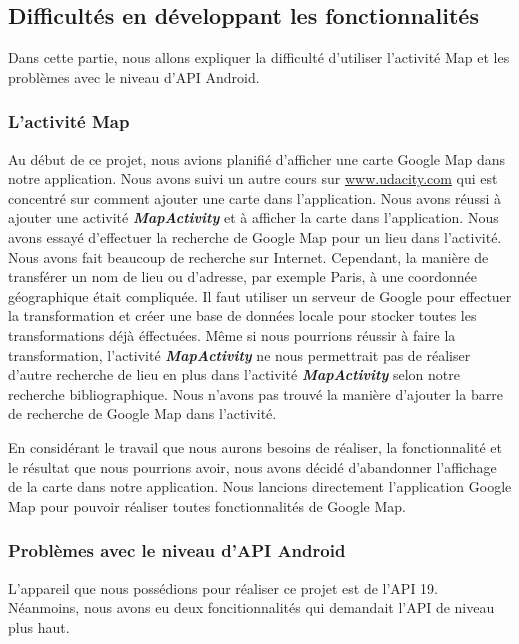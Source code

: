 \subsection{Difficultés en développant les fonctionnalités}

\indent Dans cette partie, nous allons expliquer la difficulté d'utiliser l'activité Map et les problèmes avec le niveau d'API Android.

\subsubsection{L'activité Map}

\indent Au début de ce projet, nous avions planifié d'afficher une carte Google Map dans notre application. Nous avons suivi un autre cours sur \url{www.udacity.com} qui est concentré sur comment ajouter une carte dans l'application. Nous avons réussi à ajouter une activité \textbf{\emph{MapActivity}} et à afficher la carte dans l'application. Nous avons essayé d'effectuer la recherche de Google Map pour un lieu dans l'activité. Nous avons fait beaucoup de recherche sur Internet. Cependant, la manière de transférer un nom de lieu ou d'adresse, par exemple Paris, à une coordonnée géographique était compliquée. Il faut utiliser un serveur de Google pour effectuer la transformation et créer une base de données locale pour stocker toutes les transformations déjà éffectuées. Même si nous pourrions réussir à faire la transformation, l'activité \textbf{\emph{MapActivity}} ne nous permettrait pas de réaliser d'autre recherche de lieu en plus dans l'activité \textbf{\emph{MapActivity}} selon notre recherche bibliographique. Nous n'avons pas trouvé la manière d'ajouter la barre de recherche de Google Map dans l'activité.

\indent En considérant le travail que nous aurons besoins de réaliser, la fonctionnalité et le résultat que nous pourrions avoir, nous avons décidé d'abandonner l'affichage de la carte dans notre application. Nous lancions directement l'application Google Map pour pouvoir réaliser toutes fonctionnalités de Google Map.

\subsubsection{Problèmes avec le niveau d'API Android}

\indent L'appareil que nous possédions pour réaliser ce projet est de l'API 19. Néanmoins, nous avons eu deux foncitionnalités qui demandait l'API de niveau plus haut.

